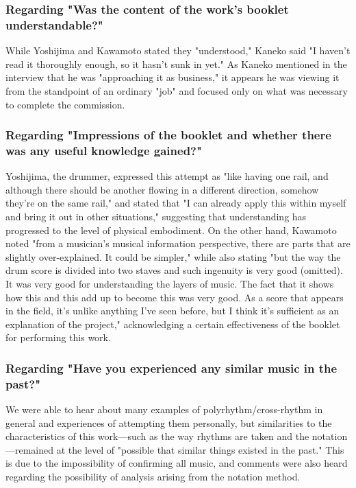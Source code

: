 \subsubsection{Regarding "Was the content of the work's booklet understandable?"}

While Yoshijima and Kawamoto stated they "understood," Kaneko said "I haven't read it thoroughly enough, so it hasn't sunk in yet." As Kaneko mentioned in the interview that he was "approaching it as business," it appears he was viewing it from the standpoint of an ordinary "job" and focused only on what was necessary to complete the commission.

\subsubsection{Regarding "Impressions of the booklet and whether there was any useful knowledge gained?"}

Yoshijima, the drummer, expressed this attempt as "like having one rail, and although there should be another flowing in a different direction, somehow they're on the same rail," and stated that "I can already apply this within myself and bring it out in other situations," suggesting that understanding has progressed to the level of physical embodiment. On the other hand, Kawamoto noted "from a musician's musical information perspective, there are parts that are slightly over-explained. It could be simpler," while also stating "but the way the drum score is divided into two staves and such ingenuity is very good (omitted). It was very good for understanding the layers of music. The fact that it shows how this and this add up to become this was very good. As a score that appears in the field, it's unlike anything I've seen before, but I think it's sufficient as an explanation of the project," acknowledging a certain effectiveness of the booklet for performing this work.

\subsubsection{Regarding "Have you experienced any similar music in the past?"}

We were able to hear about many examples of polyrhythm/cross-rhythm in general and experiences of attempting them personally, but similarities to the characteristics of this work—such as the way rhythms are taken and the notation—remained at the level of "possible that similar things existed in the past." This is due to the impossibility of confirming all music, and comments were also heard regarding the possibility of analysis arising from the notation method.

